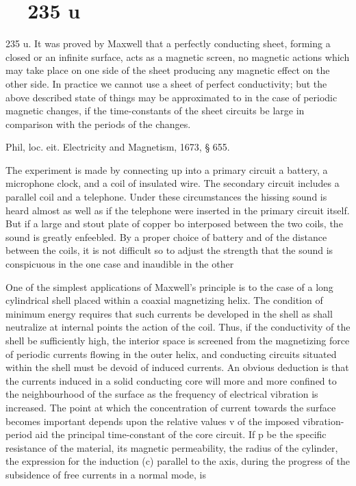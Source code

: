 \section{~~235 u}
235 u. It was proved by Maxwell that a perfectly conducting sheet, forming a
closed or an infinite surface, acts as a magnetic screen, no magnetic actions
which may take place on one side of the sheet producing any magnetic effect on
the other side.  In practice we cannot use a sheet of perfect conductivity; but
the above described state of things may be approximated to in the case of
periodic magnetic changes, if the time-constants of the sheet circuits be large
in comparison with the periods of the changes.

 Phil, loc. eit.  Electricity and Magnetism, 1673, § 655.

The experiment is made by connecting up into a primary
circuit a battery, a microphone clock, and a coil of insulated wire.
The secondary circuit includes a parallel coil and a telephone.
Under these circumstances the hissing sound is heard almost as
well as if the telephone were inserted in the primary circuit
itself. But if a large and stout plate of copper bo interposed
between the two coils, the sound is greatly enfeebled. By a proper
choice of battery and of the distance between the coils, it is not
difficult so to adjust the strength that the sound is conspicuous in
the one case and inaudible in the other

One of the simplest applications of Maxwell's principle is to
the case of a long cylindrical shell placed within a coaxial magnetizing helix.
The condition of minimum energy requires that such
currents be developed in the shell as shall neutralize at internal
points the action of the coil. Thus, if the conductivity of the
shell be sufficiently high, the interior space is screened from the
magnetizing force of periodic currents flowing in the outer helix,
and conducting circuits situated within the shell must be devoid
of induced currents. An obvious deduction is that the currents
induced in a solid conducting core will more and more confined
to the neighbourhood of the surface as the frequency of electrical
vibration is increased.
The point at which the concentration of current towards the
surface becomes important depends upon the relative values v of the
imposed vibration-period aid the principal time-constant of the
core circuit. If p be the specific resistance of the material, its
magnetic permeability, the radius of the cylinder, the expression
for the induction (c) parallel to the axis, during the progress of the
subsidence of free currents in a normal mode, is


